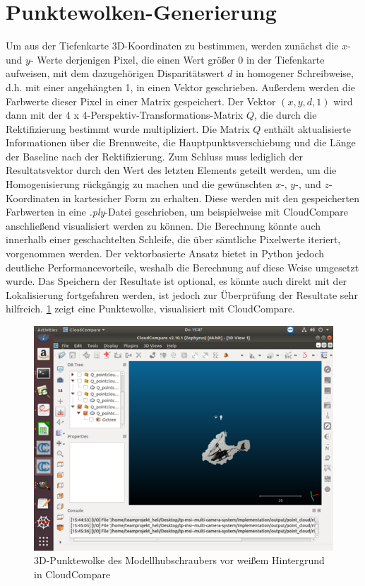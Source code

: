 \section{Punktewolken-Generierung} 
\label{sec:pointgen}

Um aus der Tiefenkarte 3D-Koordinaten zu bestimmen, werden zunächst die $x$- und $y$- Werte derjenigen Pixel, die einen Wert größer 0 in der Tiefenkarte aufweisen, mit dem dazugehörigen Disparitätswert $d$ in homogener Schreibweise, d.h. mit einer angehängten 1, in einen Vektor geschrieben. Außerdem werden die Farbwerte dieser Pixel in einer Matrix gespeichert. Der Vektor $(x, y, d, 1)$ wird dann mit der 4 x 4-Perspektiv-Transformations-Matrix $Q$, die durch die Rektifizierung bestimmt wurde multipliziert. Die Matrix $Q$ enthält aktualisierte Informationen über die Brennweite, die Hauptpunktsverschiebung und die Länge der Baseline nach der Rektifizierung. Zum Schluss muss lediglich der Resultatsvektor durch den Wert des letzten Elements geteilt werden, um die Homogenisierung rückgängig zu machen und die gewünschten $x$-, $y$-, und $z$-Koordinaten in kartesicher Form zu erhalten. Diese werden mit den gespeicherten Farbwerten in eine \textit{.ply}-Datei geschrieben, um beispielweise mit CloudCompare anschließend visualisiert werden zu können.\newline
Die Berechnung könnte auch innerhalb einer geschachtelten Schleife, die über sämtliche Pixelwerte iteriert, vorgenommen werden. Der vektorbasierte Ansatz bietet in Python jedoch deutliche Performancevorteile, weshalb die Berechnung auf diese Weise umgesetzt wurde. Das Speichern der Resultate ist optional, es könnte auch direkt mit der Lokalisierung fortgefahren werden, ist jedoch zur Überprüfung der Resultate sehr hilfreich. \ref{fig:cloudresult} zeigt eine Punktewolke, visualisiert mit CloudCompare.

\begin{figure}[H]
	\includegraphics[scale=1.0]{bilder/cloud_result}
	\caption[3D-Punktewolke des Modellhubschraubers vor weißem Hintergrund in CloudCompare]{3D-Punktewolke des Modellhubschraubers vor weißem Hintergrund in CloudCompare}
	\label{fig:cloudresult}%
\end{figure}

